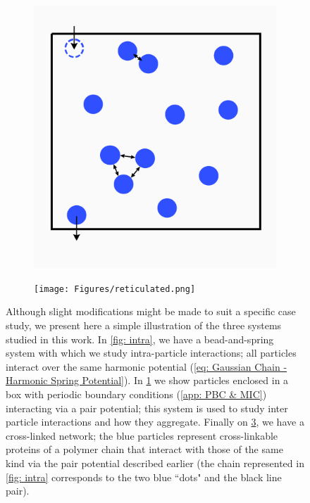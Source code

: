 \documentclass[../../main.tex]{subfiles}
\begin{document}
\begin{figure}[h]
\begin{subfigure}[b]{0.328\textwidth}
                \includegraphics[width=\textwidth]{Figures/inter.png}
                \caption{}
                \label{fig: inter}
            \end{subfigure}
            \begin{subfigure}[b]{0.328\textwidth}
                \centering
                \texttt{[image: Figures/reticulated.png]}
                \caption{}
                \label{fig: reticulated}
            \end{subfigure}
            \caption{Although slight modifications might be made to suit a specific case study, we present here a simple illustration of the three systems studied in this work. In \cref{fig: intra}, we have a bead-and-spring system with which we study intra-particle interactions; all particles interact over the same harmonic potential (\cref{eq: Gaussian Chain - Harmonic Spring Potential}). In \cref{fig: inter} we show particles enclosed in a box with periodic boundary conditions (\cref{app: PBC & MIC}) interacting via a pair potential; this system is used to study inter particle interactions and how they aggregate. Finally on \cref{fig: reticulated}, we have a cross-linked network; the blue particles represent cross-linkable proteins of a polymer chain that interact with those of the same kind via the pair potential described earlier (the chain represented in \cref{fig: intra} corresponds to the two blue ``dots" and the black line pair).}
        \end{figure}
        

    

%
\end{document}
